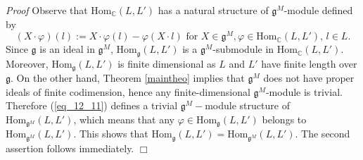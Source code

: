\documentclass[10pt]{amsart}
\renewenvironment{proof}{ \emph{Proof}}{$\Box$}
\renewcommand{\gg}{\mathfrak{g}}
\renewcommand {\phi} {\varphi}
\newcommand{\Hom}{\mathrm{Hom}}
\begin{document}
\begin{proof} Observe that $\Hom_{\mathbb C}(L,L')$ has a natural structure of $\gg^M$-module defined by
\begin{equation}\label{eq_12_11}
(X\cdot \varphi)(l):=X\cdot\varphi(l)-\varphi (X\cdot l)\,\,\text{for}\,\, X\in\gg^M, \varphi\in \Hom_{\mathbb C}(L,L'),\,l\in L. 
\end{equation}
Since $\gg$ is an ideal in $\gg^M$, $\Hom_{\gg}(L,L')$ is a $\gg^M$-submodule in $\Hom_{\mathbb C}(L,L')$. Moreover, $\Hom_{\gg}(L,L')$ is finite dimensional as $L$ and $L'$ have finite length over $\gg$. On the other hand, Theorem \ref{maintheo} implies that $\gg^M$ does not have proper ideals of finite codimension, hence any finite-dimensional $\gg^M$-module is trivial. Therefore (\ref{eq_12_11}) defines a trivial $\gg^M-$module structure of $\Hom_{\gg^M}(L,L')$, which means that any $\phi \in \Hom_\gg(L,L')$ belongs to $\Hom_{\gg^M}(L,L')$. This shows that $\Hom_{\gg}(L,L')=\Hom_{\gg^M}(L,L')$.
The second assertion follows immediately.
\end{proof}

\vspace{0.3cm}
\end{document}
